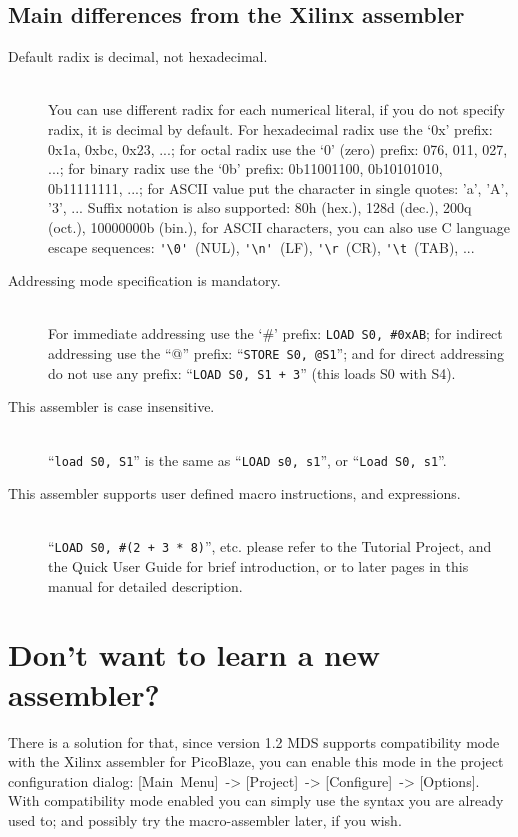     \subsection{Main differences from the Xilinx assembler}
        \begin{description}
            \item[Default radix is decimal, not hexadecimal.]~\\
                You can use different radix for each numerical literal, if you do not specify radix, it is decimal by default. For hexadecimal radix use the `0x' prefix: 0x1a, 0xbc, 0x23, ...; for octal radix use the `0' (zero) prefix: 076, 011, 027, ...; for binary radix use the `0b' prefix: 0b11001100, 0b10101010, 0b11111111, ...; for ASCII value put the character in single quotes: 'a', 'A', '3', ... Suffix notation is also supported: 80h (hex.), 128d (dec.), 200q (oct.), 10000000b (bin.), for ASCII characters, you can also use C language escape sequences: \verb"'\0'"~(NUL), \verb"'\n'"~(LF), \verb"'\r"~(CR), \verb"'\t"~(TAB), ...
            \item[Addressing mode specification is mandatory.]~\\
                For immediate addressing use the `\#' prefix: \texttt{LOAD~S0,~\#0xAB}; for indirect addressing use the ``@'' prefix: ``\texttt{STORE~S0,~@S1}''; and for direct addressing do not use any prefix: ``\texttt{LOAD~S0,~S1~+~3}'' (this loads S0 with S4).
            \item[This assembler is case insensitive.]~\\
                ``\texttt{load~S0,~S1}'' is the same as ``\texttt{LOAD~s0,~s1}'', or ``\texttt{Load~S0,~s1}''.
            \item[This assembler supports user defined macro instructions, and expressions.]~\\
                ``\texttt{LOAD~S0,~\#(2~+~3~*~8)}'', etc. please refer to the Tutorial Project, and the Quick User Guide for brief introduction, or to later pages in this manual for detailed description.
        \end{description}

\clearpage
\section{Don't want to learn a new assembler?}
    There is a solution for that, since version 1.2 MDS supports compatibility mode with the Xilinx assembler for PicoBlaze, you can enable this mode in the project configuration dialog: [Main~Menu]~-> [Project]~-> [Configure]~-> [Options]. With compatibility mode enabled you can simply use the syntax you are already used to; and possibly try the macro-assembler later, if you wish.

